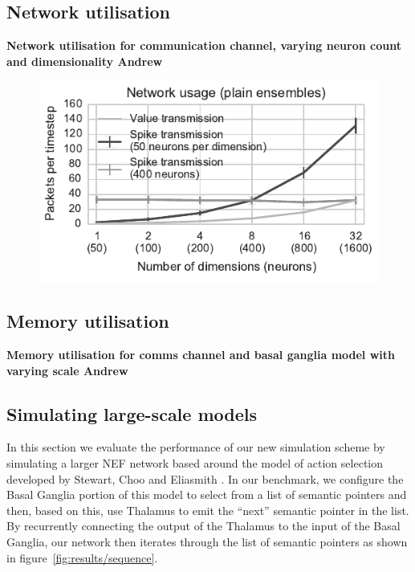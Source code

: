 \documentclass[conference]{IEEEtran}
\begin{document}
  \subsection{Network utilisation}

  \textbf{Network utilisation for communication channel, varying neuron count and dimensionality \color{red} Andrew}

  \begin{figure}[!t]
    \includegraphics{figures/network-1}
    \caption{}
    \label{fig:results/network-utilisation}
  \end{figure}

  \subsection{Memory utilisation}

  \textbf{Memory utilisation for comms channel and basal ganglia model with varying scale \color{red} Andrew}

  \subsection{Simulating large-scale models}
  \label{sec:spa-sequence}

In this section we evaluate the performance of our new simulation scheme by simulating a larger NEF network based around the model of action selection developed by Stewart, Choo and Eliasmith \parencite{Stewart2010}. 
In our benchmark, we configure the Basal Ganglia portion of this model to select from a list of semantic pointers and then, based on this, use Thalamus to emit the ``next'' semantic pointer in the list. By recurrently connecting the output of the Thalamus to the input of the Basal Ganglia, our network then iterates through the list of semantic pointers as shown in figure~\ref{fig:results/sequence}.
\end{document}
